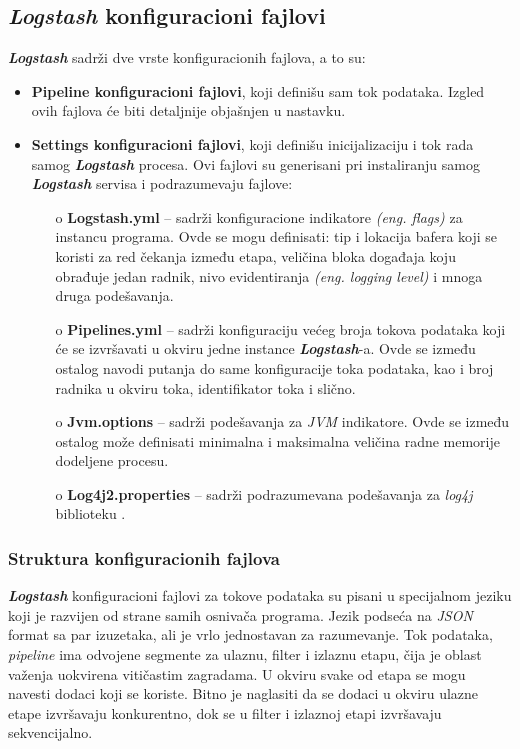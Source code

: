 \subsection{\textit{\textbf{Logstash}} konfiguracioni fajlovi}
\textit{\textbf{Logstash}} sadrži dve vrste konfiguracionih fajlova, a to su:
\begin{itemize}
    \item \textbf{Pipeline konfiguracioni fajlovi}, koji definišu sam tok podataka. Izgled ovih fajlova će biti detaljnije objašnjen u nastavku.
    \item \textbf{Settings konfiguracioni fajlovi}, koji definišu inicijalizaciju i tok rada samog \textit{\textbf{Logstash}} procesa. Ovi fajlovi su generisani pri instaliranju samog \textit{\textbf{Logstash}} servisa i podrazumevaju fajlove:
    \begin{itemize}
        \item[o] \textbf{Logstash.yml} – sadrži konfiguracione indikatore \textit{(eng. flags)} za instancu programa. Ovde se mogu definisati: tip i lokacija bafera koji se koristi za red čekanja između etapa, veličina bloka događaja koju obrađuje jedan radnik, nivo evidentiranja \textit{(eng. logging level)} i mnoga druga podešavanja.
        \item[o] \textbf{Pipelines.yml} – sadrži konfiguraciju većeg broja tokova podataka koji će se izvršavati u okviru jedne instance \textit{\textbf{Logstash}}-a. Ovde se između ostalog navodi putanja do same konfiguracije toka podataka, kao i broj radnika u okviru toka, identifikator toka i slično.
        \item[o] \textbf{Jvm.options} – sadrži podešavanja za \textit{JVM} indikatore. Ovde se između ostalog može definisati minimalna i maksimalna veličina radne memorije dodeljene procesu.
        \item[o] \textbf{Log4j2.properties} – sadrži podrazumevana podešavanja za \textit{log4j} biblioteku \cite{log4j}.
    \end{itemize}
\end{itemize}

\subsubsection{Struktura konfiguracionih fajlova}
\textit{\textbf{Logstash}} konfiguracioni fajlovi za tokove podataka su pisani u specijalnom jeziku \cite{logstash-pipeline-language} koji je razvijen od strane samih osnivača programa. Jezik podseća na \textit{JSON} format sa par izuzetaka, ali je vrlo jednostavan za razumevanje.
Tok podataka, \textit{pipeline} ima odvojene segmente za ulaznu, filter i izlaznu etapu, čija je oblast važenja uokvirena vitičastim zagradama. U okviru svake od etapa se mogu navesti dodaci koji se koriste.  Bitno je naglasiti da se dodaci u okviru ulazne etape izvršavaju konkurentno, dok se u filter i izlaznoj etapi izvršavaju sekvencijalno.

